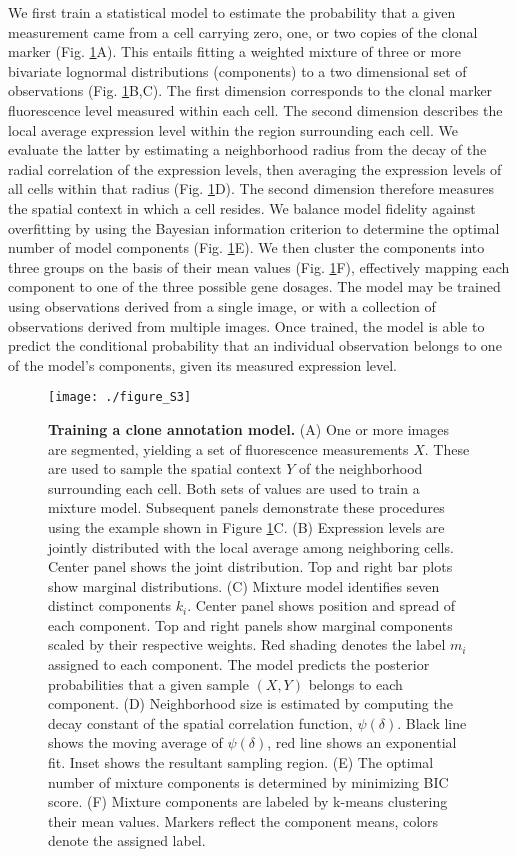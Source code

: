 We first train a statistical model to estimate the probability that a given measurement came from a cell carrying zero, one, or two copies of the clonal marker (Fig. \ref{fig:clones:figS3}A). This entails fitting a weighted mixture of three or more bivariate lognormal distributions (components) to a two dimensional set of observations (Fig. \ref{fig:clones:figS3}B,C). The first dimension corresponds to the clonal marker fluorescence level measured within each cell. The second dimension describes the local average expression level within the region surrounding each cell. We evaluate the latter by estimating a neighborhood radius from the decay of the radial correlation of the expression levels, then averaging the expression levels of all cells within that radius (Fig. \ref{fig:clones:figS3}D). The second dimension therefore measures the spatial context in which a cell resides. We balance model fidelity against overfitting by using the Bayesian information criterion to determine the optimal number of model components (Fig. \ref{fig:clones:figS3}E). We then cluster the components into three groups on the basis of their mean values (Fig. \ref{fig:clones:figS3}F), effectively mapping each component to one of the three possible gene dosages. The model may be trained using observations derived from a single image, or with a collection of observations derived from multiple images. Once trained, the model is able to predict the conditional probability that an individual observation belongs to one of the model's components, given its measured expression level.

\begin{figure}[h]
\texttt{[image: ./figure\_S3]}
\caption[Training a clone annotation model.]{\textbf{Training a clone annotation model.} (A) One or more images are segmented, yielding a set of fluorescence measurements $X$. These are used to sample the spatial context $Y$ of the neighborhood surrounding each cell. Both sets of values are used to train a mixture model. Subsequent panels demonstrate these procedures using the example shown in Figure \ref{fig:clones:figS3}C. (B) Expression levels are jointly distributed with the local average among neighboring cells. Center panel shows the joint distribution. Top and right bar plots show marginal distributions. (C) Mixture model identifies seven distinct components $k_i$. Center panel shows position and spread of each component. Top and right panels show marginal components scaled by their respective weights. Red shading denotes the label $m_i$ assigned to each component. The model predicts the posterior probabilities that a given sample $(X,Y)$ belongs to each component. (D) Neighborhood size is estimated by computing the decay constant of the spatial correlation function, $\psi(\delta)$. Black line shows the moving average of $\psi(\delta)$, red line shows an exponential fit. Inset shows the resultant sampling region. (E) The optimal number of mixture components is determined by minimizing BIC score. (F) Mixture components are labeled by k-means clustering their mean values. Markers reflect the component means, colors denote the assigned label.}
\label{fig:clones:figS3}
\end{figure}

